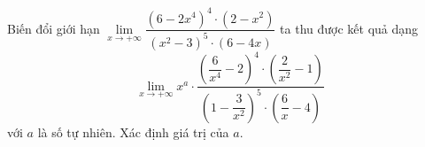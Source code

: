 \begin{ex}
Biến đổi giới hạn $\lim\limits_{x\to+\infty}\dfrac{(6-2x^4)^4\cdot(2-x^2)}{(x^2-3)^5\cdot(6-4x)}$ ta thu được kết quả dạng \[\lim\limits_{x\to+\infty}x^a\cdot\dfrac{\left(\dfrac6{x^4}-2\right)^4\cdot\left(\dfrac2{x^2}-1\right)}{\left(1-\dfrac3{x^2}\right)^5\cdot\left(\dfrac6x-4\right)}\] với $a$ là số tự nhiên. Xác định giá trị của $a$.
\end{ex}
